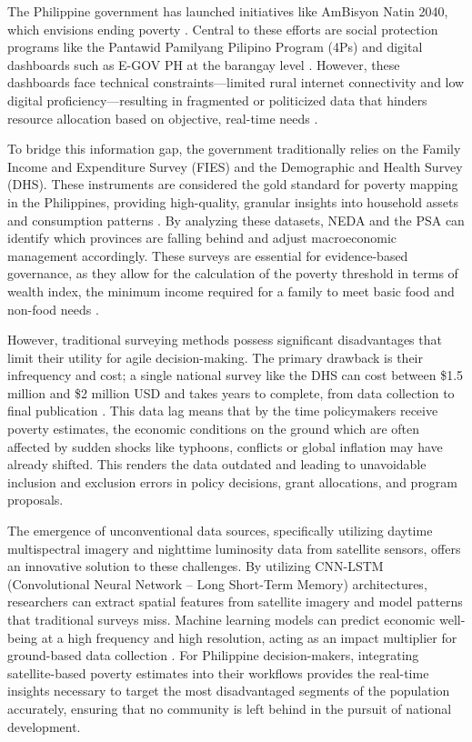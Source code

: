 \documentclass[12pt, letterpaper]{article}
\numberwithin{figure}{section}
\numberwithin{table}{section}
\begin{document}
The Philippine government has launched initiatives like AmBisyon
Natin 2040, which envisions ending poverty \parencite{NEDA2015}.
Central to these efforts are social protection programs like the
Pantawid Pamilyang Pilipino Program (4Ps) and digital dashboards such
as E-GOV PH at the barangay level \parencite{DICT2019}. However,
these dashboards face technical constraints—limited rural internet
connectivity and low digital proficiency—resulting in fragmented or
politicized data that hinders resource allocation based on objective,
real-time needs \parencite{Jou2024}.

To bridge this information gap, the government traditionally relies
on the Family Income and Expenditure Survey (FIES) and the
Demographic and Health Survey (DHS). These instruments are considered
the gold standard for poverty mapping in the Philippines, providing
high-quality, granular insights into household assets and consumption
patterns \parencite{PSA2023a}. By analyzing these datasets, NEDA and
the PSA can identify which provinces are falling behind and adjust
macroeconomic management accordingly. These surveys are essential for
evidence-based governance, as they allow for the calculation of the
poverty threshold in terms of wealth index, the minimum income
required for a family to meet basic food and non-food needs
\parencite{Onsay2024}.

However, traditional surveying methods possess significant
disadvantages that limit their utility for agile decision-making. The
primary drawback is their infrequency and cost; a single national
survey like the DHS can cost between \$1.5 million and \$2 million
USD and takes years to complete, from data collection to final
publication \parencite{Burke2021}. This data lag means that by the
time policymakers receive poverty estimates, the economic conditions
on the ground which are often affected by sudden shocks like
typhoons, conflicts or global inflation may have already shifted. This
renders the data outdated and leading to unavoidable inclusion and
exclusion errors in policy decisions, grant allocations, and program proposals.

The emergence of unconventional data sources, specifically utilizing
daytime multispectral imagery and nighttime luminosity data from
satellite sensors, offers an innovative solution to these challenges.
By utilizing CNN-LSTM (Convolutional Neural Network – Long Short-Term
Memory) architectures, researchers can extract spatial features from
satellite imagery and model patterns that traditional surveys miss.
Machine learning models can predict economic well-being at a high
frequency and high resolution, acting as an impact multiplier for
ground-based data collection \parencite{Burke2021}. For Philippine
decision-makers, integrating satellite-based poverty estimates into
their workflows provides the real-time insights necessary to target
the most disadvantaged segments of the population accurately,
ensuring that no community is left behind in the pursuit of national
development.
\end{document}
